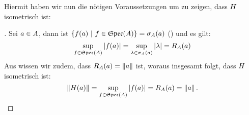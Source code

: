 Hiermit haben wir nun die nötigen Voraussetzungen um zu zeigen, dass $H$ isometrisch ist:

\begin{proof}[]
Sei $a \in A$, dann ist $\{f(a) ~|~ f \in \mathfrak{Spec}(A)\} = \sigma_A(a)$ () und es gilt:
	\[\underset{f \in \mathfrak{Spec}(A)}{\sup}\left|f(a)\right| = \underset{\lambda \in \sigma_A(a)}{\sup}\left|\lambda\right| = R_A(a)\]
Aus  wissen wir zudem, dass $R_A(a) = \left\lVert a\right\rVert$ ist, woraus insgesamt folgt, dass $H$ isometrisch ist:
	\[\left\lVert H(a)\right\rVert = \underset{f \in \mathfrak{Spec}(A)}{\sup}\left|f(a)\right| = R_A(a) = \left\lVert a\right\rVert.\]
\let\qed\relax
\end{proof}